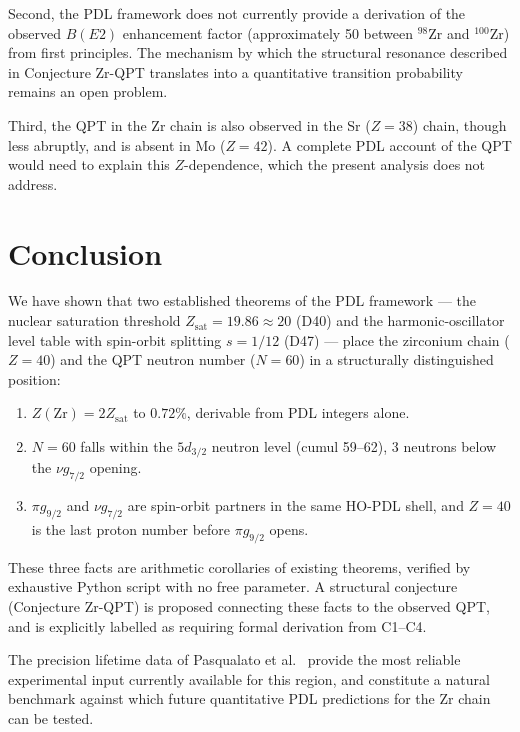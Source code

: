 \documentclass[11pt,a4paper]{article}
\theoremstyle{definition}
\theoremstyle{remark}
\newcommand{\Zsat}{Z_{\mathrm{sat}}}
\begin{document}
Second, the PDL framework does not currently provide a derivation of the observed $B(E2)$ enhancement factor (approximately 50 between $^{98}$Zr and $^{100}$Zr) from first principles. The mechanism by which the structural resonance described in Conjecture Zr-QPT translates into a quantitative transition probability remains an open problem.

Third, the QPT in the Zr chain is also observed in the Sr ($Z=38$) chain, though less abruptly, and is absent in Mo ($Z=42$). A complete PDL account of the QPT would need to explain this $Z$-dependence, which the present analysis does not address.

\section{Conclusion}
\label{sec:conclusion}

We have shown that two established theorems of the PDL framework --- the nuclear saturation threshold $\Zsat = 19.86 \approx 20$ (D40) and the harmonic-oscillator level table with spin-orbit splitting $s = 1/12$ (D47) --- place the zirconium chain ($Z=40$) and the QPT neutron number ($N=60$) in a structurally distinguished position:

\begin{enumerate}
  \item $Z(\mathrm{Zr}) = 2\Zsat$ to $0.72\%$, derivable from PDL integers alone.
  \item $N=60$ falls within the $5d_{3/2}$ neutron level (cumul 59--62), 3 neutrons below the $\nu g_{7/2}$ opening.
  \item $\pi g_{9/2}$ and $\nu g_{7/2}$ are spin-orbit partners in the same HO-PDL shell, and $Z=40$ is the last proton number before $\pi g_{9/2}$ opens.
\end{enumerate}

These three facts are arithmetic corollaries of existing theorems, verified by exhaustive Python script with no free parameter. A structural conjecture (Conjecture Zr-QPT) is proposed connecting these facts to the observed QPT, and is explicitly labelled as requiring formal derivation from C1--C4.

The precision lifetime data of Pasqualato et al.~\cite{Pasqualato_2024} provide the most reliable experimental input currently available for this region, and constitute a natural benchmark against which future quantitative PDL predictions for the Zr chain can be tested.
\end{document}
